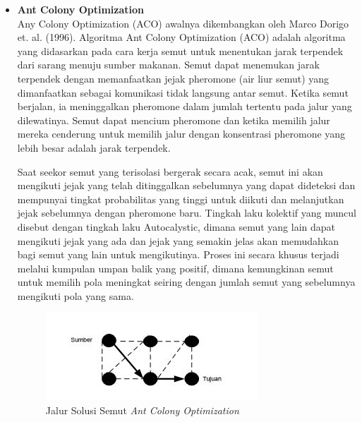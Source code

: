 \documentclass[a4paper,twoside]{article}
\begin{document}
\begin{enumerate}
\begin{itemize}
		\end{itemize}	
		
		
		
		\begin{itemize}
		\item{\bf Ant Colony Optimization}\\
		Any Colony Optimization (ACO) awalnya dikembangkan oleh Marco Dorigo et. al. (1996). Algoritma Ant Colony Optimization (ACO) adalah algoritma yang didasarkan pada cara kerja semut untuk menentukan jarak terpendek dari sarang menuju sumber makanan. Semut dapat menemukan jarak terpendek dengan memanfaatkan jejak pheromone (air liur semut) yang dimanfaatkan sebagai komunikasi tidak langsung antar semut. Ketika semut berjalan, ia meninggalkan pheromone dalam jumlah tertentu pada jalur yang dilewatinya. Semut dapat mencium pheromone dan ketika memilih jalur mereka cenderung untuk memilih jalur dengan konsentrasi pheromone yang lebih besar adalah jarak terpendek.
		
		Saat seekor semut yang terisolasi bergerak secara acak, semut ini akan mengikuti jejak yang telah ditinggalkan sebelumnya yang dapat dideteksi dan mempunyai tingkat probabilitas yang tinggi untuk diikuti dan melanjutkan jejak sebelumnya dengan pheromone baru. Tingkah laku kolektif yang muncul disebut dengan tingkah laku Autocalystic, dimana semut yang lain dapat mengikuti jejak yang ada dan jejak yang semakin jelas akan memudahkan bagi semut yang lain untuk mengikutinya. Proses ini secara khusus terjadi melalui kumpulan umpan balik yang positif, dimana kemungkinan semut untuk memilih pola meningkat seiring dengan jumlah semut yang sebelumnya mengikuti pola yang sama.
		
 		\begin{figure}[H]
			\centering
			\includegraphics[scale=0.80]{gambar4}
			\caption[Jalur Solusi Semut] {Jalur Solusi Semut {\it Ant Colony Optimization}}
			\label{fig:JaluSolusiSemut}
		\end{figure}
		

\end{itemize}
\end{enumerate}
\end{document}
